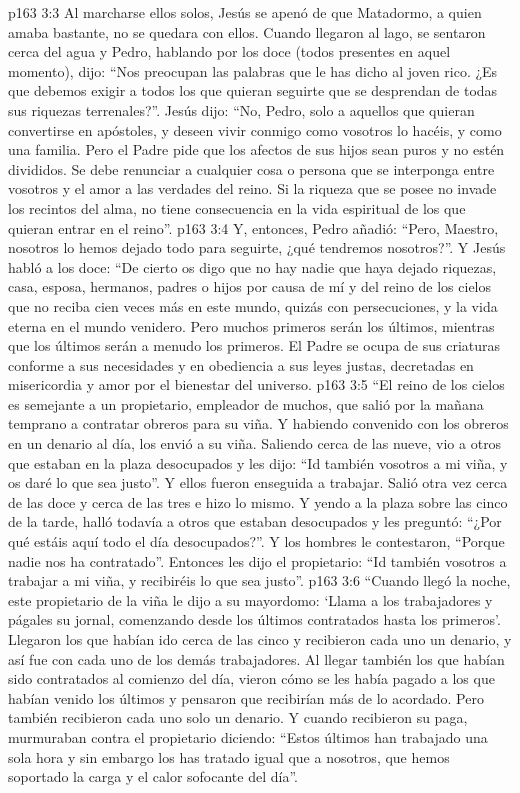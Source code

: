 \vs p163 3:3 Al marcharse ellos solos, Jesús se apenó de que Matadormo, a quien amaba bastante, no se quedara con ellos. Cuando llegaron al lago, se sentaron cerca del agua y Pedro, hablando por los doce (todos presentes en aquel momento), dijo: “Nos preocupan las palabras que le has dicho al joven rico. ¿Es que debemos exigir a todos los que quieran seguirte que se desprendan de todas sus riquezas terrenales?”. Jesús dijo: “No, Pedro, solo a aquellos que quieran convertirse en apóstoles, y deseen vivir conmigo como vosotros lo hacéis, y como una familia. Pero el Padre pide que los afectos de sus hijos sean puros y no estén divididos. Se debe renunciar a cualquier cosa o persona que se interponga entre vosotros y el amor a las verdades del reino. Si la riqueza que se posee no invade los recintos del alma, no tiene consecuencia en la vida espiritual de los que quieran entrar en el reino”.
\vs p163 3:4 Y, entonces, Pedro añadió: “Pero, Maestro, nosotros lo hemos dejado todo para seguirte, ¿qué tendremos nosotros?”. Y Jesús habló a los doce: “De cierto os digo que no hay nadie que haya dejado riquezas, casa, esposa, hermanos, padres o hijos por causa de mí y del reino de los cielos que no reciba cien veces más en este mundo, quizás con persecuciones, y la vida eterna en el mundo venidero. Pero muchos primeros serán los últimos, mientras que los últimos serán a menudo los primeros. El Padre se ocupa de sus criaturas conforme a sus necesidades y en obediencia a sus leyes justas, decretadas en misericordia y amor por el bienestar del universo.
\vs p163 3:5 “El reino de los cielos es semejante a un propietario, empleador de muchos, que salió por la mañana temprano a contratar obreros para su viña. Y habiendo convenido con los obreros en un denario al día, los envió a su viña. Saliendo cerca de las nueve, vio a otros que estaban en la plaza desocupados y les dijo: “Id también vosotros a mi viña, y os daré lo que sea justo”. Y ellos fueron enseguida a trabajar. Salió otra vez cerca de las doce y cerca de las tres e hizo lo mismo. Y yendo a la plaza sobre las cinco de la tarde, halló todavía a otros que estaban desocupados y les preguntó: “¿Por qué estáis aquí todo el día desocupados?”. Y los hombres le contestaron, “Porque nadie nos ha contratado”. Entonces les dijo el propietario: “Id también vosotros a trabajar a mi viña, y recibiréis lo que sea justo”.
\vs p163 3:6 “Cuando llegó la noche, este propietario de la viña le dijo a su mayordomo: ‘Llama a los trabajadores y págales su jornal, comenzando desde los últimos contratados hasta los primeros’. Llegaron los que habían ido cerca de las cinco y recibieron cada uno un denario, y así fue con cada uno de los demás trabajadores. Al llegar también los que habían sido contratados al comienzo del día, vieron cómo se les había pagado a los que habían venido los últimos y pensaron que recibirían más de lo acordado. Pero también recibieron cada uno solo un denario. Y cuando recibieron su paga, murmuraban contra el propietario diciendo: “Estos últimos han trabajado una sola hora y sin embargo los has tratado igual que a nosotros, que hemos soportado la carga y el calor sofocante del día”.
